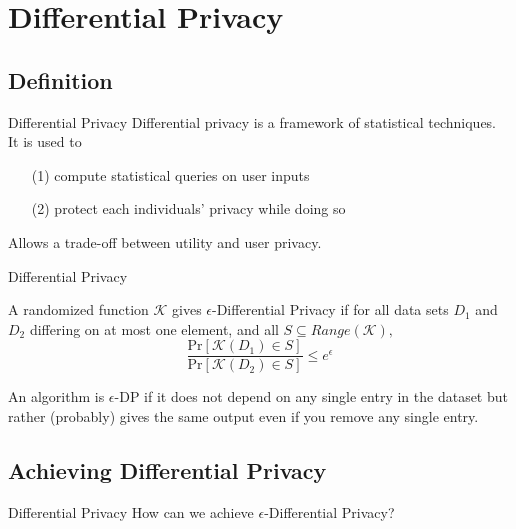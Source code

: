 \documentclass[aspectratio=43]{beamer}
\begin{document}
\section{Differential Privacy}

\subsection{Definition}

\begin{frame}{Differential Privacy}
    Differential privacy is a framework of statistical techniques.\\
    It is used to
    \bigskip
    \begin{itemize}
        \item[(1)] compute statistical queries on user inputs
        \item[(2)] protect each individuals' privacy while doing so
    \end{itemize}
    \bigskip
    Allows a trade-off between utility and user privacy.
\end{frame}


\begin{frame}{Differential Privacy}
    \begin{definition}
        A randomized function $\mathcal{K}$ gives $\epsilon$-Differential Privacy if for all data sets $D_1$ and $D_2$ differing on at most one element, and all $S \subseteq Range(\mathcal{K}),$
        $$
        \frac{\text{Pr}[\mathcal{K}(D_1) \in S]}{\text{Pr}[\mathcal{K}(D_2) \in S]} \leq e^{\epsilon}
        $$
    \end{definition}
    \bigskip
    An algorithm is $\epsilon$-DP if it does not depend on any single entry in the dataset but rather (probably) gives the same output even if you remove any single entry.
\end{frame}


\subsection{Achieving Differential Privacy}

\begin{frame}{Differential Privacy}
    \centering
    How can we achieve $\epsilon$-Differential Privacy?
\end{frame}
\end{document}
